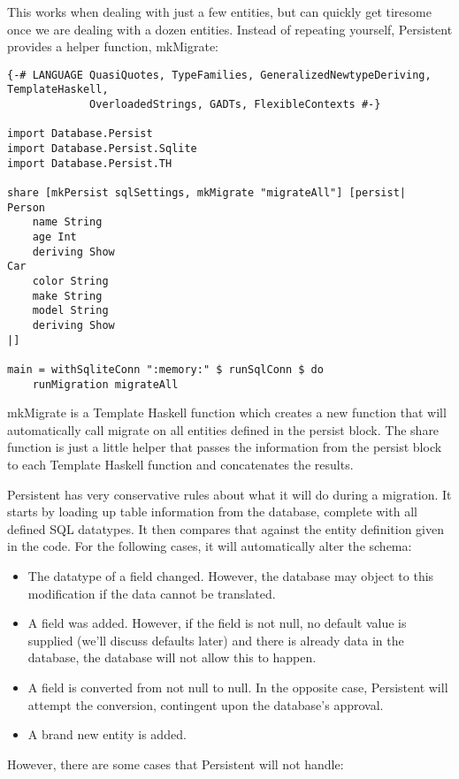 This works when dealing with just a few entities, but can quickly get tiresome once we are dealing with a dozen entities. Instead of repeating yourself, Persistent provides a helper function, mkMigrate:

\begin{lstlisting}
{-# LANGUAGE QuasiQuotes, TypeFamilies, GeneralizedNewtypeDeriving, TemplateHaskell,
             OverloadedStrings, GADTs, FlexibleContexts #-}

import Database.Persist
import Database.Persist.Sqlite
import Database.Persist.TH

share [mkPersist sqlSettings, mkMigrate "migrateAll"] [persist|
Person
    name String
    age Int
    deriving Show
Car
    color String
    make String
    model String
    deriving Show
|]

main = withSqliteConn ":memory:" $ runSqlConn $ do
    runMigration migrateAll
\end{lstlisting}%

mkMigrate is a Template Haskell function which creates a new function that will automatically call migrate on all entities defined in the persist block. The share function is just a little helper that passes the information from the persist block to each Template Haskell function and concatenates the results.

Persistent has very conservative rules about what it will do during a migration. It starts by loading up table information from the database, complete with all defined SQL datatypes. It then compares that against the entity definition given in the code. For the following cases, it will automatically alter the schema:

\begin{itemize}
	\item The datatype of a field changed. However, the database may object to this modification if the data cannot be translated.
	\item A field was added. However, if the field is not null, no default value is supplied (we'll discuss defaults later) and there is already data in the database, the database will not allow this to happen.
	\item A field is converted from not null to null. In the opposite case, Persistent will attempt the conversion, contingent upon the database's approval.
	\item A brand new entity is added.
\end{itemize}

However, there are some cases that Persistent will not handle:

